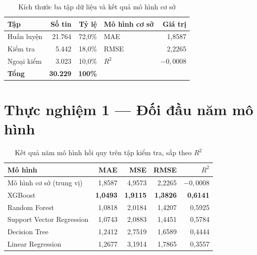 \begin{table}[H]
\centering
\caption{Kích thước ba tập dữ liệu và kết quả mô hình cơ sở}
\label{tab:split-hou}
\small
\begin{tabular}{@{}lrr@{\hspace{1.4cm}}lr@{}}
\toprule
\textbf{Tập} & \textbf{Số tin} & \textbf{Tỷ lệ} & \textbf{Mô hình cơ sở} & \textbf{Giá trị} \\
\midrule
Huấn luyện & 21.764 & 72{,}0\% & MAE  & 1{,}8587 \\
Kiểm tra   &  5.442 & 18{,}0\% & RMSE & 2{,}2265 \\
Ngoại kiểm &  3.023 & 10{,}0\% & $R^2$ & \textbf{$-0{,}0008$} \\
\textbf{Tổng} & \textbf{30.229} & \textbf{100\%} & & \\
\bottomrule
\end{tabular}
\end{table}


\section{Thực nghiệm 1 --- Đối đầu năm mô hình}
\label{sec:tn1-hou}

\begin{table}[H]
\centering
\caption{Kết quả năm mô hình hồi quy trên tập kiểm tra, sắp theo $R^2$}
\label{tab:ketqua-hou}
\small
\begin{tabular}{@{}lrrrr@{}}
\toprule
\textbf{Mô hình} & \textbf{MAE} & \textbf{MSE} & \textbf{RMSE} & \textbf{$R^2$} \\
\midrule
Mô hình cơ sở (trung vị)  & 1{,}8587 & 4{,}9573 & 2{,}2265 & $-0{,}0008$ \\
\midrule
XGBoost                   & \textbf{1{,}0493} & \textbf{1{,}9115} & \textbf{1{,}3826} & \textbf{0{,}6141} \\
Random Forest             & 1{,}0818 & 2{,}0184 & 1{,}4207 & 0{,}5925 \\
Support Vector Regression & 1{,}0743 & 2{,}0883 & 1{,}4451 & 0{,}5784 \\
Decision Tree             & 1{,}2412 & 2{,}7519 & 1{,}6589 & 0{,}4444 \\
Linear Regression         & 1{,}2677 & 3{,}1914 & 1{,}7865 & 0{,}3557 \\
\bottomrule
\end{tabular}
\end{table}

